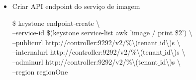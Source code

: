 \begin{enumerate}
\begin{itemize}
			
			\item Criar API endpoint do serviço de imagem
				\begin{snugshade}	
					\$ keystone endpoint-create \textbackslash \\
	  --service-id \$(keystone service-list \textbar awk '\textbar image / {print \$2}') \textbackslash \\
	  --publicurl http://controller:9292/v2/\%\textbackslash(tenant$\_$id\textbackslash)s  \textbackslash \\
	  --internalurl http://controller:9292/v2/\%\textbackslash(tenant$\_$id\textbackslash)s  \textbackslash \\
	  --adminurl http://controller:9292/v2/\%\textbackslash(tenant$\_$id\textbackslash)s  \textbackslash \\
	  --region regionOne
				\end{snugshade}	

		\end{itemize}				
\end{enumerate}


